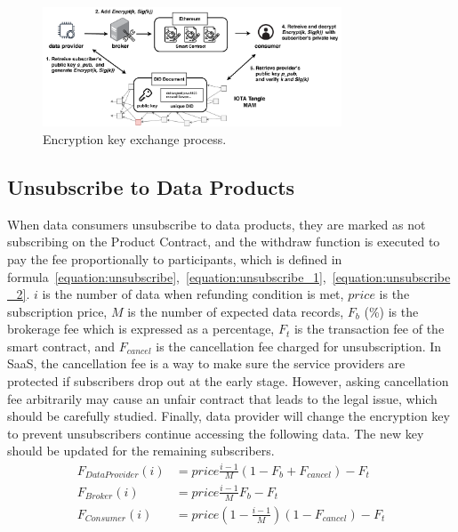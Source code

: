 \documentclass[conference]{IEEEtran}
\begin{document}
\begin{figure}[!t]
    \centering
    \includegraphics[width=3.5in]{key_exchange_reorganize}
    \caption{Encryption key exchange process.}
    \label{fig:key_exchange}
\end{figure}

\subsection{Unsubscribe to Data Products}
When data consumers unsubscribe to data products, they are marked as not subscribing on the Product Contract, and the withdraw function is executed to pay the fee proportionally to participants, which is defined in formula~\ref{equation:unsubscribe},~\ref{equation:unsubscribe_1},~\ref{equation:unsubscribe_2}. $i$ is the number of data when refunding condition is met, $price$  is the subscription price, $M$ is the number of expected data records, $F_{b}$ (\%) is the brokerage fee which is expressed as a percentage, $F_{t}$ is the transaction fee of the smart contract, and $F_{cancel}$ is the cancellation fee charged for unsubscription. In SaaS, the cancellation fee is a way to make sure the service providers are protected if subscribers drop out at the early stage. However, asking cancellation fee arbitrarily may cause an unfair contract that leads to the legal issue, which should be carefully studied. Finally, data provider will change the encryption key to prevent unsubscribers continue accessing the following data. The new key should be updated for the remaining subscribers.
\begin{align}
    F_{DataProvider}(i) &= price \frac{i-1}{M} (1-F_{b}+F_{cancel}) -F_{t} \label{equation:unsubscribe} \\
    F_{Broker}(i) &= price \frac{i-1}{M} F_{b} -F_{t} \label{equation:unsubscribe_1} \\
    F_{Consumer}(i) &= price (1-\frac{i-1}{M})(1 -F_{cancel}) -F_{t} \label{equation:unsubscribe_2}
\end{align}
\end{document}
